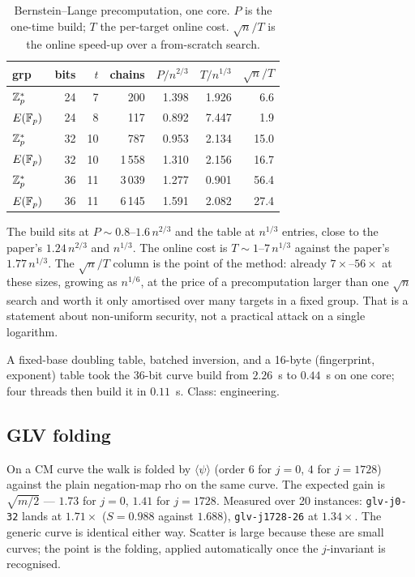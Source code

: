 \begin{table}[t]
\centering
\small
\caption{Bernstein--Lange precomputation, one core. $P$ is the
  one-time build; $T$ the per-target online cost. $\sqrt{n}/T$ is the
  online speed-up over a from-scratch search.}
\label{tab:precomp}
\begin{tabular}{@{}lrrrrrr@{}}
\toprule
grp & bits & $t$ & chains & $P/n^{2/3}$ & $T/n^{1/3}$ & $\sqrt{n}/T$ \\
\midrule
$\mathbb{Z}_p^*$ & 24 & 7 & 200 & 1.398 & 1.926 & 6.6 \\
$E(\mathbb{F}_p)$ & 24 & 8 & 117 & 0.892 & 7.447 & 1.9 \\
$\mathbb{Z}_p^*$ & 32 & 10 & 787 & 0.953 & 2.134 & 15.0 \\
$E(\mathbb{F}_p)$ & 32 & 10 & 1\,558 & 1.310 & 2.156 & 16.7 \\
$\mathbb{Z}_p^*$ & 36 & 11 & 3\,039 & 1.277 & 0.901 & 56.4 \\
$E(\mathbb{F}_p)$ & 36 & 11 & 6\,145 & 1.591 & 2.082 & 27.4 \\
\bottomrule
\end{tabular}
\end{table}

The build sits at $P\sim 0.8$--$1.6\,n^{2/3}$ and the table at
$n^{1/3}$ entries, close to the paper's $1.24\,n^{2/3}$ and
$n^{1/3}$. The online cost is $T\sim 1$--$7\,n^{1/3}$ against the
paper's $1.77\,n^{1/3}$. The $\sqrt{n}/T$ column is the point of the
method: already $7\times$--$56\times$ at these sizes, growing as
$n^{1/6}$, at the price of a precomputation larger than one
$\sqrt{n}$ search and worth it only amortised over many targets in a
fixed group. That is a statement about non-uniform security, not a
practical attack on a single logarithm.

A fixed-base doubling table, batched inversion, and a 16-byte
(fingerprint, exponent) table took the 36-bit curve build from $2.26$~s
to $0.44$~s on one core; four threads then build it in $0.11$~s. Class:
engineering.

\subsection{GLV folding}

On a CM curve the walk is folded by $\langle\psi\rangle$ (order $6$
for $j=0$, $4$ for $j=1728$) against the plain negation-map rho on the
same curve. The expected gain is $\sqrt{m/2}$ --- $1.73$ for $j=0$,
$1.41$ for $j=1728$. Measured over 20 instances: \texttt{glv-j0-32}
lands at $1.71\times$ ($S=0.988$ against $1.688$),
\texttt{glv-j1728-26} at $1.34\times$. The generic curve is identical
either way. Scatter is large because these are small curves; the
point is the folding, applied automatically once the $j$-invariant is
recognised.

